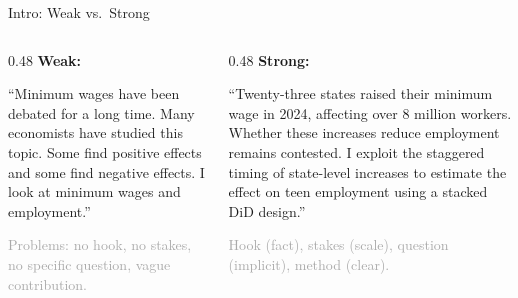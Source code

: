 \begin{frame}{Intro: Weak vs.\ Strong}
  \small
  \begin{columns}[T]
    \begin{column}{0.48\textwidth}
      \textbf{\textcolor{red!60}{Weak:}}

      \vspace{2pt}

      ``Minimum wages have been debated for a long time. Many economists have studied this topic. Some find positive effects and some find negative effects. I look at minimum wages and employment.''

      \vspace{4pt}

      {\scriptsize \textcolor{darkgray}{Problems: no hook, no stakes, no specific question, vague contribution.}}
    \end{column}
    \begin{column}{0.48\textwidth}
      \textbf{\textcolor{usfgreen}{Strong:}}

      \vspace{2pt}

      ``Twenty-three states raised their minimum wage in 2024, affecting over 8 million workers. Whether these increases reduce employment remains contested. I exploit the staggered timing of state-level increases to estimate the effect on teen employment using a stacked DiD design.''

      \vspace{4pt}

      {\scriptsize \textcolor{darkgray}{Hook (fact), stakes (scale), question (implicit), method (clear).}}
    \end{column}
  \end{columns}
\end{frame}

